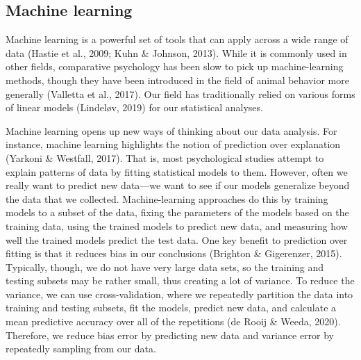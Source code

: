 \documentclass[
  english,
  ,pub,floatsintext]{apa6}
\begin{document}
\hypertarget{machine-learning}{%
\subsection{Machine learning}\label{machine-learning}}

Machine learning is a powerful set of tools that can apply across a wide range of data (Hastie et al., 2009; Kuhn \& Johnson, 2013). While it is commonly used in other fields, comparative psychology has been slow to pick up machine-learning methods, though they have been introduced in the field of animal behavior more generally (Valletta et al., 2017). Our field has traditionally relied on various forms of linear models (Lindeløv, 2019) for our statistical analyses.

Machine learning opens up new ways of thinking about our data analysis. For instance, machine learning highlights the notion of prediction over explanation (Yarkoni \& Westfall, 2017). That is, most psychological studies attempt to explain patterns of data by fitting statistical models to them. However, often we really want to predict new data---we want to see if our models generalize beyond the data that we collected. Machine-learning approaches do this by training models to a subset of the data, fixing the parameters of the models based on the training data, using the trained models to predict new data, and measuring how well the trained models predict the test data. One key benefit to prediction over fitting is that it reduces bias in our conclusions (Brighton \& Gigerenzer, 2015). Typically, though, we do not have very large data sets, so the training and testing subsets may be rather small, thus creating a lot of variance. To reduce the variance, we can use cross-validation, where we repeatedly partition the data into training and testing subsets, fit the models, predict new data, and calculate a mean predictive accuracy over all of the repetitions (de Rooij \& Weeda, 2020). Therefore, we reduce bias error by predicting new data and variance error by repeatedly sampling from our data.
\end{document}
